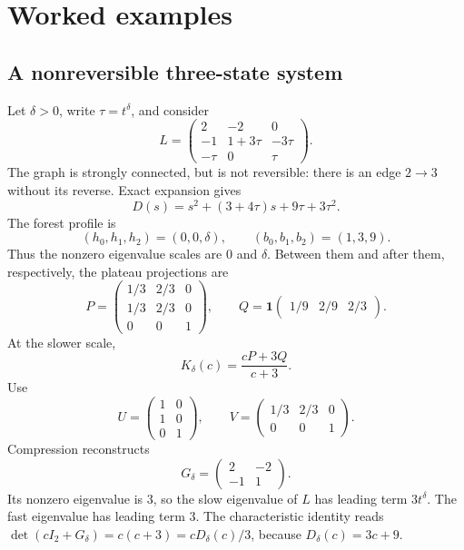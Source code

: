 \documentclass[11pt]{article}
\numberwithin{equation}{section}
\theoremstyle{definition}
\theoremstyle{remark}
\newcommand{\one}{\mathbf 1}
\begin{document}
\section{Worked examples}\label{markov:sec:examples}

\subsection{A nonreversible three-state system}

Let $\delta>0$, write $\tau=t^\delta$, and consider
\begin{equation}\label{markov:eq:example-three}
 L=\begin{pmatrix}
 2&-2&0\\
 -1&1+3\tau&-3\tau\\
 -\tau&0&\tau
 \end{pmatrix}.
\end{equation}
The graph is strongly connected, but is not reversible: there is an edge
$2\to3$ without its reverse. Exact expansion gives
\[
 D(s)=s^2+(3+4\tau)s+9\tau+3\tau^2.
\]
The forest profile is
\[
 (h_0,h_1,h_2)=(0,0,\delta),\qquad (b_0,b_1,b_2)=(1,3,9).
\]
Thus the nonzero eigenvalue scales are $0$ and $\delta$. Between them and after
them, respectively, the plateau projections are
\begin{equation}\label{markov:eq:three-projections}
 P=\begin{pmatrix}
 1/3&2/3&0\\1/3&2/3&0\\0&0&1
 \end{pmatrix},\qquad
 Q=\one\begin{pmatrix}1/9&2/9&2/3\end{pmatrix}.
\end{equation}
At the slower scale,
\begin{equation}\label{markov:eq:three-crossover}
 K_\delta(c)=\frac{cP+3Q}{c+3}.
\end{equation}
Use
\[
 U=\begin{pmatrix}1&0\\1&0\\0&1\end{pmatrix},\qquad
 V=\begin{pmatrix}1/3&2/3&0\\0&0&1\end{pmatrix}.
\]
Compression reconstructs
\[
 G_\delta=\begin{pmatrix}2&-2\\-1&1\end{pmatrix}.
\]
Its nonzero eigenvalue is $3$, so the slow eigenvalue of $L$ has leading term
$3t^\delta$. The fast eigenvalue has leading term $3$. The characteristic identity
reads $\det(cI_2+G_\delta)=c(c+3)=cD_\delta(c)/3$, because
$D_\delta(c)=3c+9$.
\end{document}
